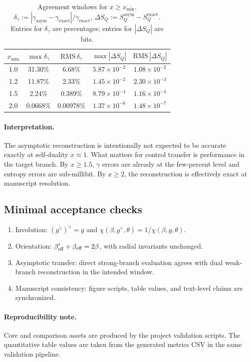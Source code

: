 \begin{table}[tbp]
  \caption{Agreement windows for \(x\ge x_{\min}\).
  \(\delta_\gamma:=|\gamma_{\mathrm{asym}}-\gamma_{\mathrm{exact}}|/\gamma_{\mathrm{exact}}\),
  \(\Delta S_Q:=S_Q^{\mathrm{asym}}-S_Q^{\mathrm{exact}}\).
  Entries for \(\delta_\gamma\) are percentages; entries for \(|\Delta S_Q|\) are bits.}
  \label{tab:exact_vs_analytic_metrics_v2}
  \begin{ruledtabular}
  \begin{tabular}{ccccc}
    \(x_{\min}\) & \(\max \delta_\gamma\) & \(\mathrm{RMS}\,\delta_\gamma\) & \(\max|\Delta S_Q|\) & \(\mathrm{RMS}\,|\Delta S_Q|\) \\
    \hline
    1.0 & 31.30\% & 6.68\% & \(5.87\times10^{-2}\) & \(1.08\times10^{-2}\) \\
    1.2 & 11.87\% & 2.33\% & \(1.45\times10^{-2}\) & \(2.30\times10^{-3}\) \\
    1.5 & 2.24\% & 0.389\% & \(8.79\times10^{-4}\) & \(1.16\times10^{-4}\) \\
    2.0 & 0.0668\% & 0.00978\% & \(1.37\times10^{-6}\) & \(1.48\times10^{-7}\) \\
  \end{tabular}
  \end{ruledtabular}
\end{table}

\paragraph{Interpretation.}
The asymptotic reconstruction is intentionally not expected to be accurate exactly at
self-duality \(x\approx1\).
What matters for control transfer is performance in the target branch.
By \(x\ge1.5\), \(\gamma\) errors are already at the few-percent level and entropy errors are
sub-millibit.
By \(x\ge2\), the reconstruction is effectively exact at manuscript resolution.

\subsection{Minimal acceptance checks}

\begin{enumerate}
  \item Involution: \((g^\vee)^\vee=g\) and
  \(\chi(\beta,g^\vee,\theta)=1/\chi(\beta,g,\theta)\).
  \item Orientation: \(\beta_{\mathrm{eff}}'+\beta_{\mathrm{eff}}=2\beta\), with radial invariants unchanged.
  \item Asymptotic transfer: direct strong-branch evaluation agrees with dual weak-branch
  reconstruction in the intended window.
  \item Manuscript consistency: figure scripts, table values, and text-level claims are synchronized.
\end{enumerate}

\paragraph{Reproducibility note.}
Core and comparison assets are produced by the project validation scripts.
The quantitative table values are taken from the generated metrics CSV in the same validation
pipeline.
